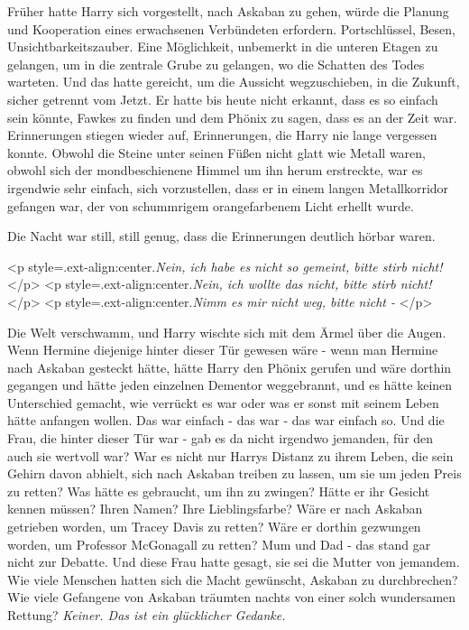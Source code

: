 Früher hatte Harry sich vorgestellt, nach Askaban zu gehen, würde die Planung
und Kooperation eines erwachsenen Verbündeten erfordern. Portschlüssel, Besen,
Unsichtbarkeitszauber. Eine Möglichkeit, unbemerkt in die unteren Etagen zu
gelangen, um in die zentrale Grube zu gelangen, wo die Schatten des Todes
warteten. Und das hatte gereicht, um die Aussicht wegzuschieben, in die Zukunft,
sicher getrennt vom Jetzt. Er hatte bis heute nicht erkannt, dass es so einfach
sein könnte, Fawkes zu finden und dem Phönix zu sagen, dass es an der Zeit war.
Erinnerungen stiegen wieder auf, Erinnerungen, die Harry nie lange vergessen
konnte. Obwohl die Steine unter seinen Füßen nicht glatt wie Metall waren,
obwohl sich der mondbeschienene Himmel um ihn herum erstreckte, war es irgendwie
sehr einfach, sich vorzustellen, dass er in einem langen Metallkorridor gefangen
war, der von schummrigem orangefarbenem Licht erhellt wurde.

Die Nacht war still, still genug, dass die Erinnerungen deutlich hörbar waren.

<p style=\grqq{}.ext-align:center\grqq{}.\emph{Nein, ich habe es nicht so
gemeint, bitte stirb nicht! }</p> <p
style=\grqq{}.ext-align:center\grqq{}.\emph{Nein, ich wollte das nicht, bitte
stirb nicht! }</p> <p style=\grqq{}.ext-align:center\grqq{}.\emph{Nimm es mir
nicht weg, bitte nicht - }</p>

Die Welt verschwamm, und Harry wischte sich mit dem Ärmel über die Augen. Wenn
Hermine diejenige hinter dieser Tür gewesen wäre - wenn man Hermine nach Askaban
gesteckt hätte, hätte Harry den Phönix gerufen und wäre dorthin gegangen und
hätte jeden einzelnen Dementor weggebrannt, und es hätte keinen Unterschied
gemacht, wie verrückt es war oder was er sonst mit seinem Leben hätte anfangen
wollen. Das war einfach - das war - das war einfach so. Und die Frau, die hinter
dieser Tür war - gab es da nicht irgendwo jemanden, für den auch sie wertvoll
war? War es nicht nur Harrys Distanz zu ihrem Leben, die sein Gehirn davon
abhielt, sich nach Askaban treiben zu lassen, um sie um jeden Preis zu retten?
Was hätte es gebraucht, um ihn zu zwingen? Hätte er ihr Gesicht kennen müssen?
Ihren Namen? Ihre Lieblingsfarbe? Wäre er nach Askaban getrieben worden, um
Tracey Davis zu retten? Wäre er dorthin gezwungen worden, um Professor
McGonagall zu retten? Mum und Dad - das stand gar nicht zur Debatte. Und diese
Frau hatte gesagt, sie sei die Mutter von jemandem. Wie viele Menschen hatten
sich die Macht gewünscht, Askaban zu durchbrechen? Wie viele Gefangene von
Askaban träumten nachts von einer solch wundersamen Rettung?\emph{ Keiner. Das
ist ein glücklicher Gedanke.}

